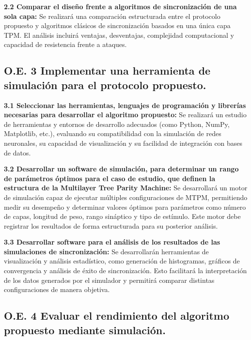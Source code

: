 \textbf{2.2 Comparar el diseño frente a algoritmos de sincronización de una sola capa:}  
Se realizará una comparación estructurada entre el protocolo propuesto y algoritmos clásicos de sincronización basados en una única capa TPM. El análisis incluirá ventajas, desventajas, complejidad computacional y capacidad de resistencia frente a ataques.

\vspace{1em}

\subsection*{O.E. 3 Implementar una herramienta de simulación para el protocolo propuesto.}

\textbf{3.1 Seleccionar las herramientas, lenguajes de programación y librerías necesarias para desarrollar el algoritmo propuesto:}  
Se realizará un estudio de herramientas y entornos de desarrollo adecuados (como Python, NumPy, Matplotlib, etc.), evaluando su compatibilidad con la simulación de redes neuronales, su capacidad de visualización y su facilidad de integración con bases de datos.

\textbf{3.2 Desarrollar un software de simulación, para determinar un rango de parámetros óptimos para el caso de estudio, que definen la estructura de la Multilayer Tree Parity Machine:}  
Se desarrollará un motor de simulación capaz de ejecutar múltiples configuraciones de MTPM, permitiendo medir su desempeño y determinar valores óptimos para parámetros como número de capas, longitud de peso, rango sináptico y tipo de estímulo. Este motor debe registrar los resultados de forma estructurada para su posterior análisis.

\textbf{3.3 Desarrollar software para el análisis de los resultados de las simulaciones de sincronización:}  
Se desarrollarán herramientas de visualización y análisis estadístico, como generación de histogramas, gráficos de convergencia y análisis de éxito de sincronización. Esto facilitará la interpretación de los datos generados por el simulador y permitirá comparar distintas configuraciones de manera objetiva.

\vspace{1em}

\subsection*{O.E. 4 Evaluar el rendimiento del algoritmo propuesto mediante simulación.}

